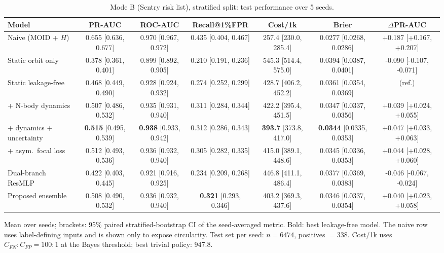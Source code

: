 \begin{table}[t]
\centering
\small
\caption{Mode B (Sentry risk list), stratified split: test performance over 5 seeds.}
\label{tab:sentry_stratified_all}
\begin{tabular}{lcccccc}
\toprule
Model & PR-AUC & ROC-AUC & Recall@1\%FPR & Cost/1k & Brier & $\Delta$PR-AUC \\
\midrule
Naive (MOID + $H$) & 0.655 \scriptsize{[0.636, 0.677]} & 0.970 \scriptsize{[0.967, 0.972]} & 0.435 \scriptsize{[0.404, 0.467]} & 257.4 \scriptsize{[230.0, 285.4]} & 0.0277 \scriptsize{[0.0268, 0.0286]} & +0.187 \scriptsize{[+0.167, +0.207]} \\
\midrule
Static orbit only & 0.378 \scriptsize{[0.361, 0.401]} & 0.899 \scriptsize{[0.892, 0.905]} & 0.210 \scriptsize{[0.191, 0.236]} & 545.3 \scriptsize{[514.4, 575.0]} & 0.0394 \scriptsize{[0.0387, 0.0401]} & -0.090 \scriptsize{[-0.107, -0.071]} \\
Static leakage-free & 0.468 \scriptsize{[0.449, 0.490]} & 0.928 \scriptsize{[0.924, 0.932]} & 0.274 \scriptsize{[0.252, 0.299]} & 428.7 \scriptsize{[406.2, 452.2]} & 0.0361 \scriptsize{[0.0354, 0.0369]} & (ref.) \\
+ N-body dynamics & 0.507 \scriptsize{[0.486, 0.532]} & 0.935 \scriptsize{[0.931, 0.940]} & 0.311 \scriptsize{[0.284, 0.344]} & 422.2 \scriptsize{[395.4, 451.5]} & 0.0347 \scriptsize{[0.0337, 0.0356]} & +0.039 \scriptsize{[+0.024, +0.055]} \\
+ dynamics + uncertainty & \textbf{0.515} \scriptsize{[0.495, 0.539]} & \textbf{0.938} \scriptsize{[0.933, 0.942]} & 0.312 \scriptsize{[0.286, 0.343]} & \textbf{393.7} \scriptsize{[373.8, 417.0]} & \textbf{0.0344} \scriptsize{[0.0335, 0.0353]} & +0.047 \scriptsize{[+0.033, +0.063]} \\
+ asym.\ focal loss & 0.512 \scriptsize{[0.493, 0.536]} & 0.936 \scriptsize{[0.932, 0.940]} & 0.305 \scriptsize{[0.282, 0.335]} & 415.0 \scriptsize{[389.1, 448.6]} & 0.0345 \scriptsize{[0.0336, 0.0353]} & +0.044 \scriptsize{[+0.028, +0.060]} \\
Dual-branch ResMLP & 0.422 \scriptsize{[0.403, 0.445]} & 0.921 \scriptsize{[0.916, 0.925]} & 0.234 \scriptsize{[0.209, 0.268]} & 446.8 \scriptsize{[411.1, 486.4]} & 0.0377 \scriptsize{[0.0369, 0.0383]} & -0.046 \scriptsize{[-0.067, -0.024]} \\
Proposed ensemble & 0.508 \scriptsize{[0.490, 0.532]} & 0.936 \scriptsize{[0.932, 0.940]} & \textbf{0.321} \scriptsize{[0.293, 0.346]} & 403.2 \scriptsize{[369.3, 437.6]} & 0.0346 \scriptsize{[0.0337, 0.0354]} & +0.040 \scriptsize{[+0.023, +0.058]} \\
\bottomrule
\end{tabular}
\par\vspace{2pt}\footnotesize Mean over seeds; brackets: 95\% paired stratified-bootstrap CI of the seed-averaged metric. Bold: best leakage-free model. The naive row uses label-defining inputs and is shown only to expose circularity. Test set per seed: $n=6474$, positives $=338$. Cost/1k uses $C_{FN}{:}C_{FP}=100{:}1$ at the Bayes threshold; best trivial policy: 947.8.
\end{table}
